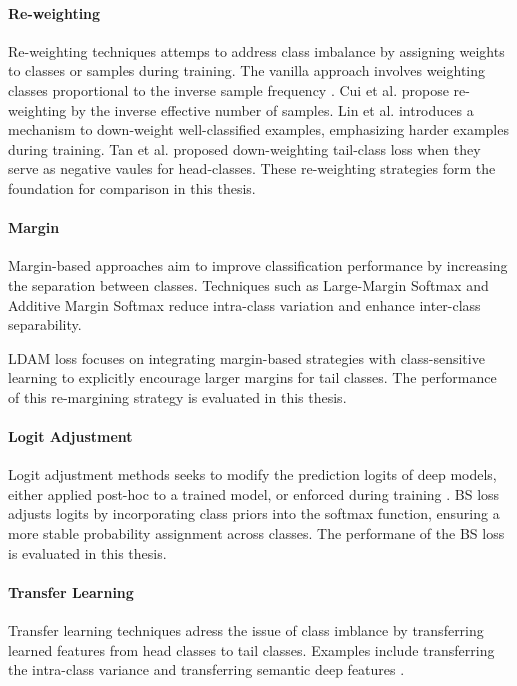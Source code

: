 \paragraph{Re-weighting}
Re-weighting techniques attemps to address class imbalance by assigning weights to classes or samples during training. The vanilla approach involves weighting classes proportional to the inverse sample frequency \cite{zhang2023deep}. Cui et al. \cite{cui2019classbalancedlossbasedeffective} propose re-weighting by the inverse effective number of samples. Lin et al. \cite{lin2018focallossdenseobject} introduces a mechanism to down-weight well-classified examples, emphasizing harder examples during training. Tan et al. \cite{tan2020equalizationlosslongtailedobject} proposed down-weighting tail-class loss when they serve as negative vaules for head-classes. These re-weighting strategies form the foundation for comparison in this thesis.

\paragraph{Margin}
Margin-based approaches aim to improve classification performance by increasing the separation between classes. Techniques such as Large-Margin Softmax \cite{liu2017largemarginsoftmaxlossconvolutional} and Additive Margin Softmax \cite{Wang_2018} reduce intra-class variation and enhance inter-class separability.

LDAM loss \cite{cao2019learningimbalanceddatasetslabeldistributionaware} focuses on integrating margin-based strategies with class-sensitive learning to explicitly encourage larger margins for tail classes. The performance of this re-margining strategy is evaluated in this thesis.

\paragraph{Logit Adjustment}
Logit adjustment methods seeks to modify the prediction logits of deep models, either applied post-hoc to a trained model, or enforced during training \cite{menon2021longtaillearninglogitadjustment}. BS loss \cite{ren2020balancedmetasoftmaxlongtailedvisual} adjusts logits by incorporating class priors into the softmax function, ensuring a more stable probability assignment across classes. The performane of the BS loss is evaluated in this thesis.

\paragraph{Transfer Learning}
Transfer learning techniques adress the issue of class imblance by transferring learned features from head classes to tail classes. Examples include transferring the intra-class variance \cite{yin2019featuretransferlearningdeep} and transferring semantic deep features \cite{liu2019largescalelongtailedrecognitionopen}.


